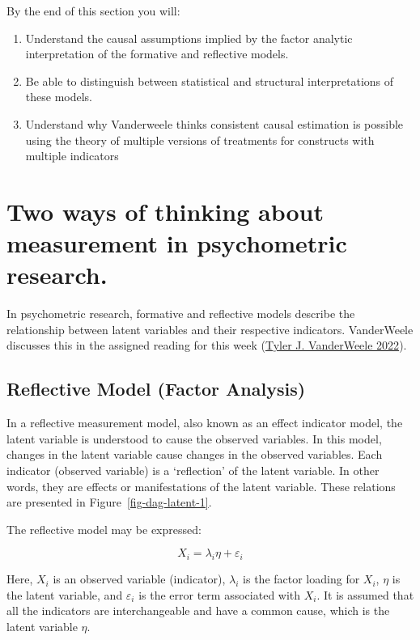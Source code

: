 \documentclass[
  singlecolumn]{report}
\begin{document}
By the end of this section you will:

\begin{enumerate}
\def\labelenumi{\arabic{enumi}.}
\item
  Understand the causal assumptions implied by the factor analytic
  interpretation of the formative and reflective models.
\item
  Be able to distinguish between statistical and structural
  interpretations of these models.
\item
  Understand why Vanderweele thinks consistent causal estimation is
  possible using the theory of multiple versions of treatments for
  constructs with multiple indicators
\end{enumerate}

\hypertarget{two-ways-of-thinking-about-measurement-in-psychometric-research.}{%
\section{Two ways of thinking about measurement in psychometric
research.}\label{two-ways-of-thinking-about-measurement-in-psychometric-research.}}

In psychometric research, formative and reflective models describe the
relationship between latent variables and their respective indicators.
VanderWeele discusses this in the assigned reading for this week
(\protect\hyperlink{ref-vanderweele2022}{Tyler J. VanderWeele 2022}).

\hypertarget{reflective-model-factor-analysis}{%
\subsection{Reflective Model (Factor
Analysis)}\label{reflective-model-factor-analysis}}

In a reflective measurement model, also known as an effect indicator
model, the latent variable is understood to cause the observed
variables. In this model, changes in the latent variable cause changes
in the observed variables. Each indicator (observed variable) is a
`reflection' of the latent variable. In other words, they are effects or
manifestations of the latent variable. These relations are presented in
Figure~\ref{fig-dag-latent-1}.

The reflective model may be expressed:

\[X_i = \lambda_i \eta + \varepsilon_i\]

Here, \(X_i\) is an observed variable (indicator), \(\lambda_i\) is the
factor loading for \(X_i\), \(\eta\) is the latent variable, and
\(\varepsilon_i\) is the error term associated with \(X_i\). It is
assumed that all the indicators are interchangeable and have a common
cause, which is the latent variable \(\eta\).
\end{document}
